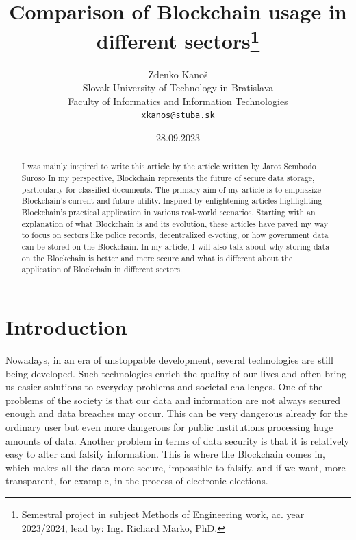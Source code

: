 \documentclass[10pt,english,a4paper]{article}
\title{Comparison of Blockchain usage in different sectors\centering\thanks{Semestral project in subject Methods of Engineering work, ac. year 2023/2024, lead by: Ing. Richard Marko, PhD.}}
\author{Zdenko Kanoš\\[2pt]
	{\small Slovak University of Technology in Bratislava}\\
	{\small Faculty of Informatics and Information Technologies}\\
	{\small \texttt{xkanos@stuba.sk}}
	}
\date{\small 28.09.2023}
\begin{document}
\maketitle

\begin{abstract}
I was mainly inspired to write this article by the article written by Jarot Sembodo Suroso\cite{Suroso:SKCK} In my perspective, Blockchain represents the future of secure data storage, particularly for classified documents. The primary aim of my article is to emphasize Blockchain’s current and future utility. Inspired by enlightening articles highlighting Blockchain's practical application in various real-world scenarios. Starting with an explanation of what Blockchain is and its evolution, these articles have paved my way to focus on sectors like police records, decentralized e-voting, or how government data can be stored on the Blockchain. In my article, I will also talk about why storing data on the Blockchain is better and more secure and what is different about the application of Blockchain in different sectors.
\end{abstract}

\section{Introduction}
Nowadays, in an era of unstoppable development, several technologies are still being developed. Such technologies enrich the quality of our lives and often bring us easier solutions to everyday problems and societal challenges. One of the problems of the society is that our data and information are not always secured enough and data breaches may occur. This can be very dangerous already for the ordinary user but even more dangerous for public institutions processing huge amounts of data. Another problem in terms of data security is that it is relatively easy to alter and falsify information.  This is where the Blockchain comes in, which makes all the data more secure, impossible to falsify, and if we want, more transparent, for example, in the process of electronic elections.
\pagebreak
\end{document}
